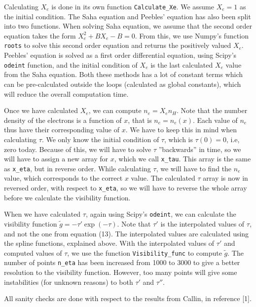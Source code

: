 \documentclass[12pt]{article}
\begin{document}
Calculating $X_e$ is done in its own function \verb|Calculate_Xe|. We assume $X_e = 1$ as the initial condition. The Saha equation and Peebles' equation has also been split into two functions. When solving Saha equation, we assume that the second order equation takes the form $X_e^2 + BX_e - B = 0$. From this, we use Numpy's function \verb|roots| to solve this second order equation and returns the positively valued $X_e$. Peebles' equation is solved as a first order differential equation, using Scipy's \verb|odeint| function, and the initial condition of $X_e$ is the last calculated $X_e$ value from the Saha equation. Both these methods has a lot of constant terms which can be pre-calculated outside the loops (calculated as global constants), which will reduce the overall computation time.

Once we have calculated $X_e$, we can compute $n_e = X_e n_H$. Note that the number density of the electrons is a function of $x$, that is $n_e = n_e(x)$. Each value of $n_e$ thus have their corresponding value of $x$. We have to keep this in mind when calculating $\tau$. We only know the initial condition of $\tau$, which is $\tau(0) = 0$, i.e, zero today. Because of this, we will have to solve $\tau$ ''backwards'' in time, so we will have to assign a new array for $x$, which we call \verb|x_tau|. This array is the same as \verb|x_eta|, but in reverse order. While calculating $\tau$, we will have to find the $n_e$ value, which corresponds to the correct $x$ value. The calculated $\tau$ array is now in reversed order, with respect to \verb|x_eta|, so we will have to reverse the whole array before we calculate the visibility function.

When we have calculated $\tau$, again using Scipy's \verb|odeint|, we can calculate the visibility function $\tilde{g} = -\tau'\exp(-\tau)$. Note that $\tau'$ is the interpolated values of $\tau$, and not the one from equation (13). The interpolated values are calculated using the spline functions, explained above. With the interpolated values of $\tau'$ and computed values of $\tau$, we use the function \verb|Visibility_func| to compute $\tilde{g}$. The number of points \verb|n_eta| has been increased from 1000 to 3000 to give a better resolution to the visibility function. However, too many points will give some instabilities (for unknown reasons) to both $\tau'$ and $\tau''$.

All sanity checks are done with respect to the results from  Callin, in reference [1].
\end{document}
